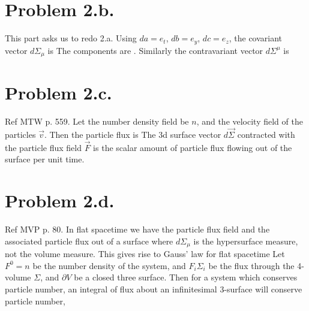 \documentclass{article}
\begin{document}
\section*{Problem 2.b.}
This part asks us to redo 2.a. Using $da=e_t$, $db=e_y$, $dc=e_z$, the covariant vector $d\Sigma_\mu$ is
The components are . 
Similarly the contravariant vector $d\Sigma^\mu$ is
\section*{Problem 2.c.}
Ref MTW p. 559. Let the number density field be $n$, and the velocity field of the particles $\vec{v}$. Then the particle flux is 
The 3d surface vector $d\vec{\Sigma}$ contracted with the particle flux field $\vec{F}$ is the scalar amount of particle flux flowing out of the surface per unit time.
\section*{Problem 2.d.}
Ref MVP p. 80. In flat spacetime we have the particle flux field
and the associated particle flux out of a surface
where $d\Sigma_\mu$ is the hypersurface measure, not the volume measure. This gives rise to Gauss' law for flat spacetime
Let $F^0=n$ be the number density of the system, and $F_i \Sigma_i$ be the flux through the 4-volume $\Sigma$, and $\partial V$ be a closed three surface. Then for a system which conserves particle number, an integral of flux about an infinitesimal 3-surface will conserve particle number,
\end{document}
